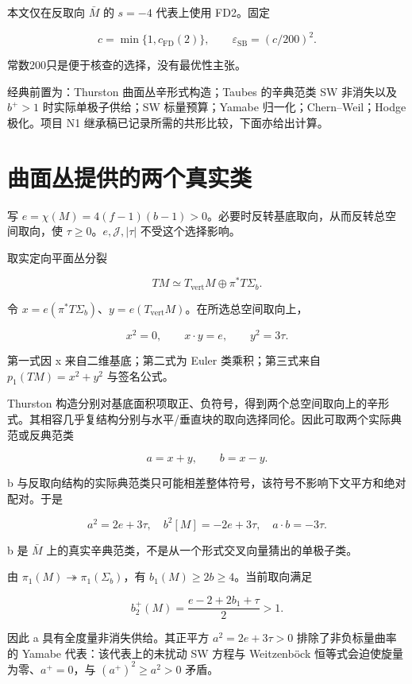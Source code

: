 \documentclass[UTF8,11pt,fontset=none]{ctexart}
\theoremstyle{definition}
\theoremstyle{remark}
\begin{document}
本文仅在反取向 \(\bar M\) 的 \(s=-4\) 代表上使用 FD2。固定

\[
c=\min\{1,c_{\mathrm{FD}}(2)\},\qquad
\boxed{\varepsilon_{\mathrm{SB}}=(c/200)^2.}
\tag{6.1.1}
\]

常数200只是便于核查的选择，没有最优性主张。

经典前置为：Thurston 曲面丛辛形式构造；Taubes 的辛典范类 SW 非消失以及 \(b^+>1\) 时实际单极子供给；SW 标量预算；Yamabe 归一化；Chern--Weil；Hodge 极化。项目 N1 继承稿已记录所需的共形比较，下面亦给出计算。

\section{曲面丛提供的两个真实类}\label{v6-ux66f2ux9762ux4e1bux63d0ux4f9bux7684ux4e24ux4e2aux771fux5b9eux7c7b}

写 \(e=\chi(M)=4(f-1)(b-1)>0\)。必要时反转基底取向，从而反转总空间取向，使 \(\tau\ge0\)。\(e,\mathcal J,|\tau|\) 不受这个选择影响。

取实定向平面丛分裂

\[
TM\simeq T_{\mathrm{vert}}M\oplus\pi^*T\Sigma_b.
\]

令 \(x=e(\pi^*T\Sigma_b)\)、\(y=e(T_{\mathrm{vert}}M)\)。在所选总空间取向上，

\[
x^2=0,\qquad x\cdot y=e,\qquad y^2=3\tau.
\tag{6.2.1}
\]

第一式因 x 来自二维基底；第二式为 Euler 类乘积；第三式来自 \(p_1(TM)=x^2+y^2\) 与签名公式。

Thurston 构造分别对基底面积项取正、负符号，得到两个总空间取向上的辛形式。其相容几乎复结构分别与水平/垂直块的取向选择同伦。因此可取两个实际典范或反典范类

\[
a=x+y,\qquad b=x-y.
\]

b 与反取向结构的实际典范类只可能相差整体符号，该符号不影响下文平方和绝对配对。于是

\[
\boxed{
 a^2=2e+3\tau,\quad b^2[M]=-2e+3\tau,
 \quad a\cdot b=-3\tau.
}
\tag{6.2.2}
\]

b 是 \(\bar M\) 上的真实辛典范类，不是从一个形式交叉向量猜出的单极子类。

由 \(\pi_1(M)\twoheadrightarrow\pi_1(\Sigma_b)\)，有 \(b_1(M)\ge2b\ge4\)。当前取向满足

\[
b_2^+(M)=\frac{e-2+2b_1+\tau}{2}>1.
\]

因此 a 具有全度量非消失供给。其正平方 \(a^2=2e+3\tau>0\) 排除了非负标量曲率的 Yamabe 代表：该代表上的未扰动 SW 方程与 Weitzenböck 恒等式会迫使旋量为零、\(a^+=0\)，与 \((a^+)^2\ge a^2>0\) 矛盾。
\end{document}
